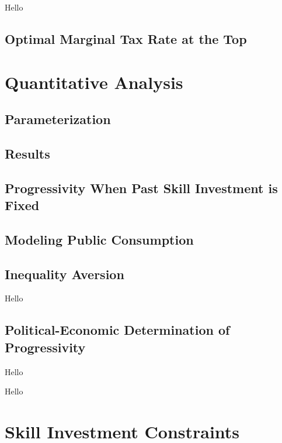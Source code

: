 \documentclass{article}
\begin{document}
{
\proposition Hello

}

\subsection{Optimal Marginal Tax Rate at the Top}

\section{Quantitative Analysis}

\subsection{Parameterization}

\subsection{Results}

\subsection{Progressivity When Past Skill Investment is Fixed}

\subsection{Modeling Public Consumption}

\subsection{Inequality Aversion}

{
\proposition Hello

}

\subsection{Political-Economic Determination of Progressivity}

{
\proposition Hello

}

{
\proposition Hello

}

\section{Skill Investment Constraints}
\end{document}
